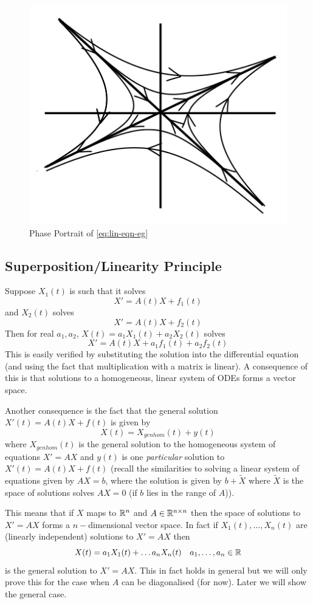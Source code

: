 \begin{figure}[h]
    \centering
    \includegraphics[scale=0.6]{Images/phase portrait.png}
    \caption{Phase Portrait of \autoref{eq:lin-eqn-eg}}
    \label{fig:phase-portrait-eg}
\end{figure}

\subsection{Superposition/Linearity Principle} \label{sec:superposition-principle}
Suppose $X_1(t)$ is such that it solves
$$ X' = A(t)X + f_1(t) $$
and $X_2(t)$ solves
$$ X' = A(t)X + f_2(t) $$
Then for real $a_1, a_2$, $X(t) = a_1 X_1(t) + a_2 X_2 (t)$ solves
$$ X' = A(t)X + a_1 f_1(t) + a_2 f_2(t) $$
This is easily verified by substituting the solution into the differential equation (and using the fact that multiplication with a matrix is linear). A consequence of this is that solutions to a homogeneous, linear system of ODEs forms a vector space. 

Another consequence is the fact that the general solution $X'(t) = A(t)X + f(t)$ is given by
$$ X(t) = X_{genhom}(t) + y(t) $$
where $X_{genhom}(t)$ is the general solution to the homogeneous system of equations $X' = AX$ and $y(t)$ is one \textit{particular} solution to $X'(t) = A(t)X + f(t)$ (recall the similarities to solving a linear system of equations given by $AX = b$, where the solution is given by $b + \tilde{X}$ where $\tilde{X}$ is the space of solutions solves $AX = 0$ (if $b$ lies in the range of $A$)).

This means that if $X$ maps to $\mathbb{R}^n$ and $A \in \mathbb{R}^{n \times n}$ then the space of solutions to $X' = AX$ forms a $n-$dimensional vector space. In fact if $X_1(t), \dots, X_n(t)$ are (linearly independent) solutions to $X' = AX$ then 
$$ X(t) = a_1 X_1(t) + \dots a_n X_n(t) \quad a_1, \dots, a_n \in \mathbb{R} $$
is the general solution to $X' = AX$. This in fact holds in general but we will only prove this for the case when $A$ can be diagonalised (for now). Later we will show the general case.

